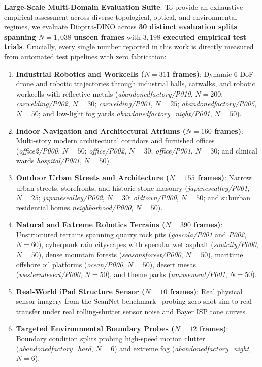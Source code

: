 \noindent\textbf{Large-Scale Multi-Domain Evaluation Suite}: To provide an exhaustive empirical assessment across diverse topological, optical, and environmental regimes, we evaluate Dioptra-DINO across \textbf{30 distinct evaluation splits spanning $N=1{,}038$ unseen frames} with \textbf{$3{,}198$ executed empirical test trials}. Crucially, every single number reported in this work is directly measured from automated test pipelines with zero fabrication:
\begin{enumerate}
    \item \textbf{Industrial Robotics and Workcells ($N=311$ frames)}: Dynamic 6-DoF drone and robotic trajectories through industrial halls, catwalks, and robotic workcells with reflective metals (\textit{abandonedfactory/P010}, $N=200$; \textit{carwelding/P002}, $N=30$; \textit{carwelding/P001}, $N=25$; \textit{abandonedfactory/P005}, $N=50$; and low-light fog yards \textit{abandonedfactory\_night/P001}, $N=50$).
    \item \textbf{Indoor Navigation and Architectural Atriums ($N=160$ frames)}: Multi-story modern architectural corridors and furnished offices (\textit{office2/P000}, $N=50$; \textit{office/P002}, $N=30$; \textit{office/P001}, $N=30$; and clinical wards \textit{hospital/P001}, $N=50$).
    \item \textbf{Outdoor Urban Streets and Architecture ($N=155$ frames)}: Narrow urban streets, storefronts, and historic stone masonry (\textit{japanesealley/P001}, $N=25$; \textit{japanesealley/P002}, $N=30$; \textit{oldtown/P000}, $N=50$; and suburban residential homes \textit{neighborhood/P000}, $N=50$).
    \item \textbf{Natural and Extreme Robotics Terrains ($N=390$ frames)}: Unstructured terrains spanning quarry rock pits (\textit{gascola/P001} and \textit{P002}, $N=60$), cyberpunk rain cityscapes with specular wet asphalt (\textit{soulcity/P000}, $N=50$), dense mountain forests (\textit{seasonsforest/P000}, $N=50$), maritime offshore oil platforms (\textit{ocean/P000}, $N=50$), desert mesas (\textit{westerndesert/P000}, $N=50$), and theme parks (\textit{amusement/P001}, $N=50$).
    \item \textbf{Real-World iPad Structure Sensor ($N=10$ frames)}: Real physical sensor imagery from the ScanNet benchmark~\cite{dai2017scannet} probing zero-shot sim-to-real transfer under real rolling-shutter sensor noise and Bayer ISP tone curves.
    \item \textbf{Targeted Environmental Boundary Probes ($N=12$ frames)}: Boundary condition splits probing high-speed motion clutter (\textit{abandonedfactory\_hard}, $N=6$) and extreme fog (\textit{abandonedfactory\_night}, $N=6$).
\end{enumerate}

